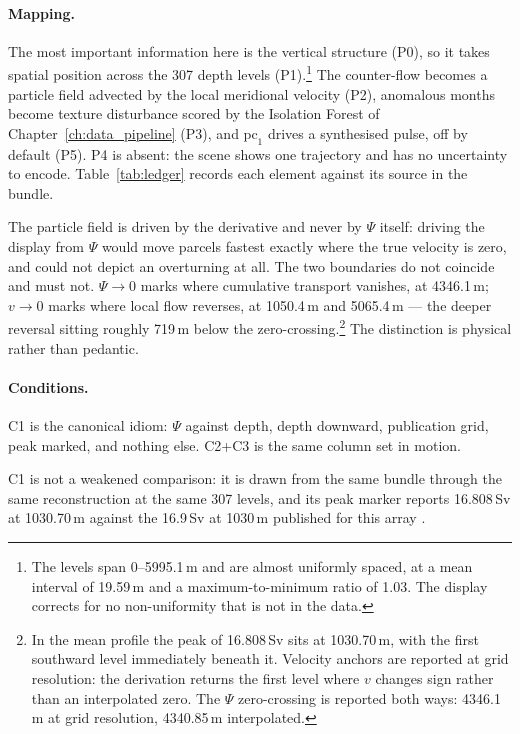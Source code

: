 \paragraph{Mapping.} The most important information here is the vertical structure (P0), so it takes spatial position across the 307 depth levels (P1).\footnote{The levels span 0--5995.1\,m and are almost uniformly spaced, at a mean interval of 19.59\,m and a maximum-to-minimum ratio of 1.03. The display corrects for no non-uniformity that is not in the data.} The counter-flow becomes a particle field advected by the local meridional velocity (P2), anomalous months become texture disturbance scored by the Isolation Forest of Chapter~\ref{ch:data_pipeline} (P3), and $\mathrm{pc}_1$ drives a synthesised pulse, off by default (P5). P4 is absent: the scene shows one trajectory and has no uncertainty to encode. Table~\ref{tab:ledger} records each element against its source in the bundle.

The particle field is driven by the derivative and never by $\Psi$ itself: driving the display from $\Psi$ would move parcels fastest exactly where the true velocity is zero, and could not depict an overturning at all. The two boundaries do not coincide and must not. $\Psi \to 0$ marks where cumulative transport vanishes, at 4346.1\,m; $v \to 0$ marks where local flow reverses, at 1050.4\,m and 5065.4\,m --- the deeper reversal sitting roughly 719\,m below the zero-crossing.\footnote{In the mean profile the peak of 16.808\,Sv sits at 1030.70\,m, with the first southward level immediately beneath it. Velocity anchors are reported at grid resolution: the derivation returns the first level where $v$ changes sign rather than an interpolated zero. The $\Psi$ zero-crossing is reported both ways: 4346.1\,m at grid resolution, 4340.85\,m interpolated.} The distinction is physical rather than pedantic.

\paragraph{Conditions.} C1 is the canonical idiom: $\Psi$ against depth, depth downward, publication grid, peak marked, and nothing else. C2+C3 is the same column set in motion.

C1 is not a weakened comparison: it is drawn from the same bundle through the same reconstruction at the same 307 levels, and its peak marker reports 16.808\,Sv at 1030.70\,m against the 16.9\,Sv at 1030\,m published for this array \parencite{smeed2018}.

